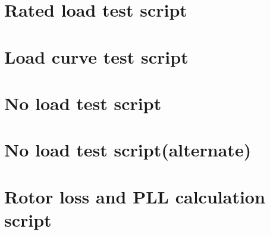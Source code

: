 \newpage
\section*{Rated load test script}


\section*{Load curve test script}


\section*{No load test script}


\section*{No load test script(alternate)}


\section*{Rotor loss and PLL calculation script}

